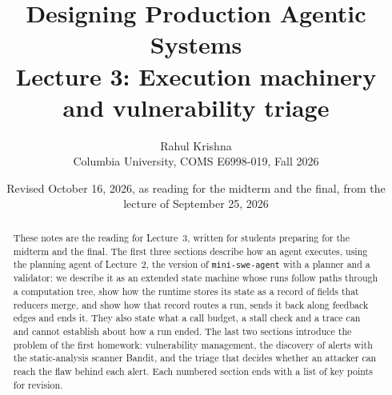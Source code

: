 \documentclass[9pt,twocolumn]{extarticle}
\title{Designing Production Agentic Systems\\Lecture 3: Execution machinery and vulnerability triage}
\author{Rahul Krishna\\Columbia University, COMS E6998-019, Fall 2026}
\date{Revised October 16, 2026, as reading for the midterm and the final, from the lecture of September 25, 2026}
\theoremstyle{definition}
\newcommand{\msa}{\texttt{mini-swe-agent}}     %
\begin{document}
\maketitle
\begin{abstract}
These notes are the reading for Lecture~3, written for students preparing for the midterm and the
final. The first three sections describe how an agent executes, using the planning agent of
Lecture~2, the version of \msa{} with a planner and a validator: we describe it as an extended state
machine whose runs follow paths through a computation tree, show how the runtime stores its state as
a record of fields that reducers merge, and show how that record routes a run, sends it back along
feedback edges and ends it. They also state what a call budget, a stall check and a trace can and
cannot establish about how a run ended. The last two sections introduce the problem of the first
homework: vulnerability management, the discovery of alerts with the static-analysis scanner Bandit,
and the triage that decides whether an attacker can reach the flaw behind each alert. Each numbered
section ends with a list of key points for revision.
\end{abstract}
\tableofcontents







\clearpage


\end{document}
